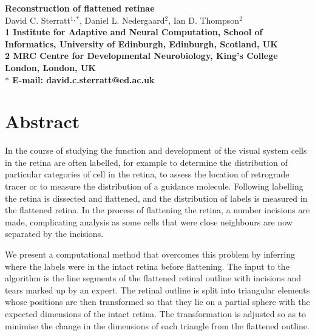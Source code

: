 \documentclass[10pt]{article}
\date{}
\begin{document}
\begin{flushleft}
{\Large
\textbf{Reconstruction of flattened retinae}
}
\\
David C. Sterratt$^{1,\ast}$, Daniel L. Nedergaard$^{2}$, Ian
D. Thompson$^{2}$
\\
\bf{1} Institute for Adaptive and Neural Computation, School of
Informatics, University of Edinburgh, Edinburgh, Scotland, UK
\\
\bf{2} MRC Centre for Developmental Neurobiology, King's College
London, London, UK
\\
$\ast$ E-mail: david.c.sterratt@ed.ac.uk
\end{flushleft}

\section*{Abstract}


In the course of studying the function and development of the visual
system cells in the retina are often labelled, for example to
determine the distribution of particular categories of cell in the
retina, to assess the location of retrograde tracer or to measure the
distribution of a guidance molecule.  Following labelling the retina
is dissected and flattened, and the distribution of labels is measured
in the flattened retina.  In the process of flattening the retina, a
number incisions are made, complicating analysis as some cells that
were close neighbours are now separated by the incisions.  

We present a computational method that overcomes this problem by
inferring where the labels were in the intact retina before
flattening. The input to the algorithm is the line segments of the
flattened retinal outline with incisions and tears marked up by an
expert. The retinal outline is split into triangular elements whose
positions are then transformed so that they lie on a partial sphere
with the expected dimensions of the intact retina.  The transformation
is adjusted so as to minimise the change in the dimensions of each
triangle from the flattened outline.
\end{document}
